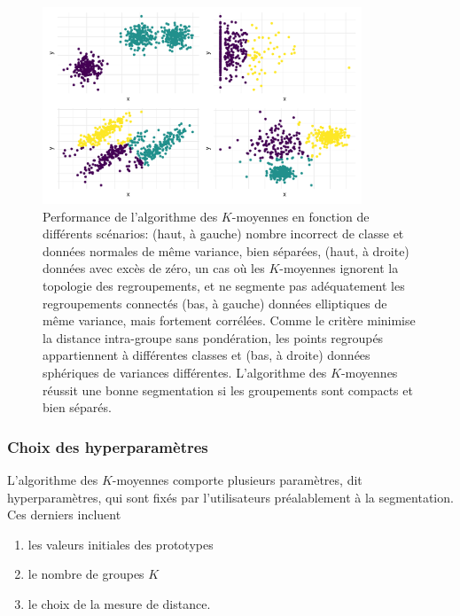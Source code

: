 \documentclass[
  11pt,
  letterpaper,
]{scrbook}
\providecommand{\tightlist}{%
  \setlength{\itemsep}{0pt}\setlength{\parskip}{0pt}}\usepackage{longtable,booktabs,array}
\theoremstyle{definition}
\theoremstyle{remark}
\begin{document}
\begin{figure}[ht!]

{\centering \includegraphics[width=0.85\textwidth,height=\textheight]{regroupements_files/figure-pdf/kmoyperfo-1.pdf}

}

\caption{Performance de l'algorithme des \(K\)-moyennes en fonction de
différents scénarios: (haut, à gauche) nombre incorrect de classe et
données normales de même variance, bien séparées, (haut, à droite)
données avec excès de zéro, un cas où les \(K\)-moyennes ignorent la
topologie des regroupements, et ne segmente pas adéquatement les
regroupements connectés (bas, à gauche) données elliptiques de même
variance, mais fortement corrélées. Comme le critère minimise la
distance intra-groupe sans pondération, les points regroupés
appartiennent à différentes classes et (bas, à droite) données
sphériques de variances différentes. L'algorithme des \(K\)-moyennes
réussit une bonne segmentation si les groupements sont compacts et bien
séparés.}

\end{figure}

\hypertarget{choix-des-hyperparamuxe8tres}{%
\subsubsection*{Choix des
hyperparamètres}\label{choix-des-hyperparamuxe8tres}}

L'algorithme des \(K\)-moyennes comporte plusieurs paramètres, dit
hyperparamètres, qui sont fixés par l'utilisateurs préalablement à la
segmentation. Ces derniers incluent

\begin{enumerate}
\def\labelenumi{\arabic{enumi}.}
\tightlist
\item
  les valeurs initiales des prototypes
\item
  le nombre de groupes \(K\)
\item
  le choix de la mesure de distance.
\end{enumerate}
\end{document}
